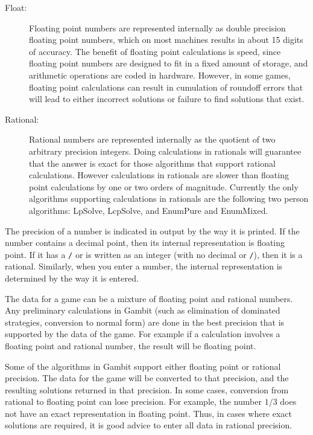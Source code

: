 \documentclass[12pt]{report}
\begin{document}
\begin{description}
\item[Float:] Floating point numbers are represented internally as
double precision floating point numbers, which on most machines
results in about 15 digits of accuracy.  The benefit of floating point
calculations is speed, since floating point numbers are designed to
fit in a fixed amount of storage, and arithmetic operations are coded
in hardware.  However, in some games, floating point calculations can
result in cumulation of roundoff errors that will lead to either
incorrect solutions or failure to find solutions that exist.
\item[Rational:] Rational numbers are represented internally as the
quotient of two arbitrary precision integers.  Doing calculations in
rationals will guarantee that the answer is exact for those algorithms
that support rational calculations.  However calculations in rationals
are slower than floating point calculations by one or two orders of
magnitude.  Currently the only algorithms supporting calculations in
rationals are the following two person algorithms: LpSolve, LcpSolve,
and EnumPure and EnumMixed.
\end{description}

The precision of a number is indicated in output by the way it is
printed.  If the number contains a decimal point, then its internal
representation is floating point.  If it has a \verb+/+ or is written
as an integer (with no decimal or \verb+/+), then it is a rational.
Similarly, when you enter a number, the internal representation is
determined by the way it is entered.

The data for a game can be a mixture of floating point and rational
numbers.  Any preliminary calculations in Gambit (such as elimination
of dominated strategies, conversion to normal form) are done in the
best precision that is supported by the data of the game.  For example
if a calculation involves a floating point and rational number, the
result will be floating point.

Some of the algorithms in Gambit support either floating point or
rational precision. The data for the game will be converted to that
precision, and the resulting solutions returned in that precision.  In
some cases, conversion from rational to floating point can lose
precision.  For example, the number $1/3$ does not have an exact
representation in floating point.  Thus, in cases where exact
solutions are required, it is good advice to enter all data in
rational precision.
\end{document}
